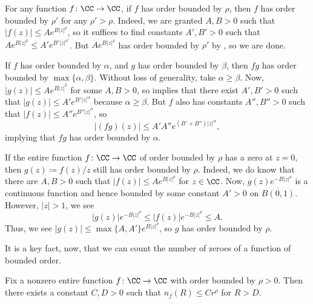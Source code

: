 \documentclass[notes.tex]{subfiles}
\begin{document}
\begin{remark} \label{rem:order-bounded-by-is-trans}
	For any function $f\colon\CC\to\CC$, if $f$ has order bounded by $\rho$, then $f$ has order bounded by $\rho'$ for any $\rho'>\rho$. Indeed, we are granted $A,B>0$ such that $|f(z)|\le Ae^{B|z|^\rho}$, so it suffices to find constants $A',B'>0$ such that $Ae^{B|z|^\rho}\le A'e^{B'|z|^{\rho'}}$. But $Ae^{B|z|^\rho}$ has order bounded by $\rho'$ by , so we are done.
\end{remark}
\begin{remark}
	If $f$ has order bounded by $\alpha$, and $g$ has order bounded by $\beta$, then $fg$ has order bounded by $\max\{\alpha,\beta\}$. Without loss of generality, take $\alpha\ge\beta$. Now, $|g(z)|\le Ae^{B|z|^\beta}$ for some $A,B>0$, so  implies that there exist $A',B'>0$ such that $|g(z)|\le A'e^{B'|z|^{\alpha}}$ because $\alpha\ge\beta$. But $f$ also has constants $A'',B''>0$ such that $|f(z)|\le A''e^{B''|z|^\alpha}$, so
	\[|(fg)(z)|\le A'A''e^{(B'+B'')|z|^\alpha},\]
	implying that $fg$ has order bounded by $\alpha$.
\end{remark}
\begin{remark} \label{rem:divide-by-z-keeps-order}
	If the entire function $f\colon\CC\to\CC$ of order bounded by $\rho$ has a zero at $z=0$, then $g(z)\coloneqq f(z)/z$ still has order bounded by $\rho$. Indeed, we do know that there are $A,B>0$ such that $|f(z)|\le Ae^{B|z|^\rho}$ for $z\in\CC$. Now, $g(z)e^{-B|z|^\rho}$ is a continuous function and hence bounded by some constant $A'>0$ on $\overline{B(0,1)}$. However, $|z|>1$, we see
	\[|g(z)|e^{-B|z|^\rho}\le|f(z)|e^{-B|z|^\rho}\le A.\]
	Thus, we see $|g(z)|\le\max\{A,A'\}e^{B|z|^\rho}$, so $g$ has order bounded by $\rho$.
\end{remark}
It is a key fact, now, that we can count the number of zeroes of a function of bounded order.
\begin{proposition} \label{prop:bound-zeroes-finite-order}
	Fix a nonzero entire function $f\colon\CC\to\CC$ with order bounded by $\rho>0$. Then there exists a constant $C,D>0$ such that $n_f(R)\le Cr^\rho$ for $R>D$.
\end{proposition}
\end{document}
